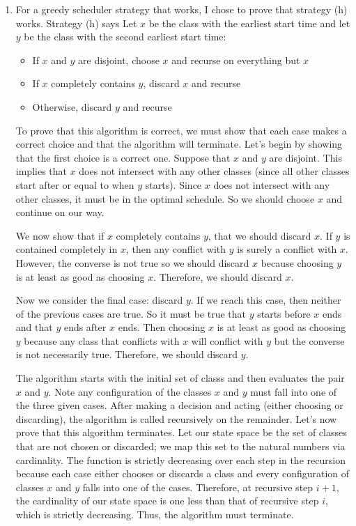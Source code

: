 \documentclass{article}
\begin{document}
\begin{enumerate}
    \item For a greedy scheduler strategy that works, I chose to prove that strategy (h) works.
    Strategy (h) says Let $x$ be the class with the earliest start time and let $y$ be the class with the second earliest start time:
    \begin{itemize}
        \item If $x$ and $y$ are disjoint, choose $x$ and recurse on everything but $x$
        \item If $x$ completely contains $y$, discard $x$ and recurse
        \item Otherwise, discard $y$ and recurse
    \end{itemize}
    To prove that this algorithm is correct, we must show that each case makes a correct choice and that the algorithm will terminate.
    Let's begin by showing that the first choice is a correct one.
    Suppose that $x$ and $y$ are disjoint.
    This implies that $x$ does not intersect with any other classes (since all other classes start after or equal to when $y$ starts).
    Since $x$ does not intersect with any other classes, it must be in the optimal schedule.
    So we should choose $x$ and continue on our way.

    We now show that if $x$ completely contains $y$, that we should discard $x$.
    If $y$ is contained completely in $x$, then any conflict with $y$ is surely a conflict with $x$.
    However, the converse is not true so we should discard $x$ because choosing $y$ is at least as good as choosing $x$.
    Therefore, we should discard $x$.

    Now we consider the final case: discard $y$.
    If we reach this case, then neither of the previous cases are true.
    So it must be true that $y$ starts before $x$ ends and that $y$ ends after $x$ ends.
    Then choosing $x$ is at least as good as choosing $y$ because any class that conflicts with $x$ will conflict with $y$ but the converse is not necessarily true.
    Therefore, we should discard $y$.

    The algorithm starts with the initial set of classs and then evaluates the pair $x$ and $y$.
    Note any configuration of the classes $x$ and $y$ must fall into one of the three given cases.
    After making a decision and acting (either choosing or discarding), the algorithm is called recursively on the remainder.
    Let's now prove that this algorithm terminates.
    Let our state space be the set of classes that are not chosen or discarded; we map this set to the natural numbers via cardinality.
    The function is strictly decreasing over each step in the recursion because each case either chooses or discards a class and every configuration of classes $x$ and $y$ falls into one of the cases.
    Therefore, at recursive step $i+1$, the cardinality of our state space is one less than that of recursive step $i$, which is strictly decreasing.
    Thus, the algorithm must terminate.


\end{enumerate}
\end{document}
